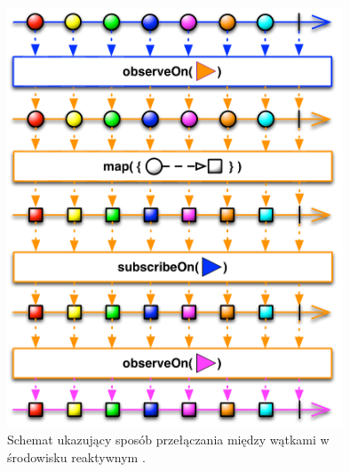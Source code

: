\documentclass[12pt,oneside,a4paper]{report}
\begin{document}
\begin{figure}[ht!]
	\centering
	\includegraphics[width=10cm]{schedulers}
	\caption{Schemat ukazujący sposób przełączania między wątkami w środowisku reaktywnym \cite{scheduler}.}
	\label{schedulers}
\end{figure}

\pagebreak
\end{document}
